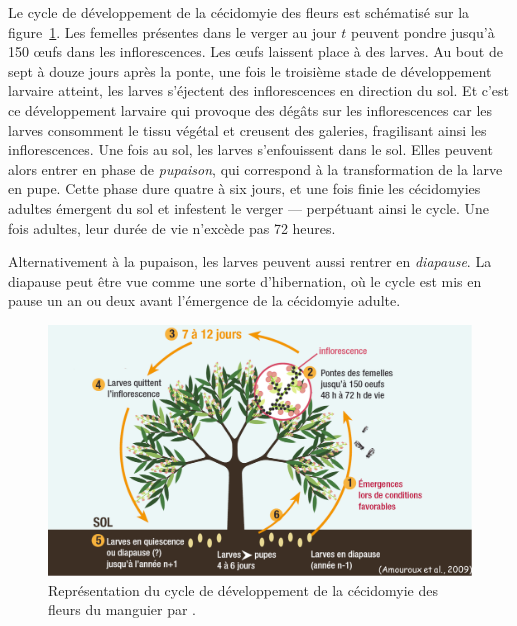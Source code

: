 
Le cycle de développement de la cécidomyie des fleurs est schématisé sur la figure~\ref{fig:cycle}.
Les femelles présentes dans le verger au jour $t$ peuvent pondre jusqu'à 150 œufs dans les inflorescences.
Les œufs laissent place à des larves.
Au bout de sept à douze jours après la ponte, une fois le troisième stade de développement larvaire atteint, les larves s'éjectent des inflorescences en direction du sol.
Et c'est ce développement larvaire qui provoque des dégâts sur les inflorescences car les larves consomment le tissu végétal et creusent des galeries, fragilisant ainsi les inflorescences.
Une fois au sol, les larves s'enfouissent dans le sol. 
Elles peuvent alors entrer en phase de \emph{pupaison}, qui correspond à la transformation de la larve en pupe.
Cette phase dure quatre à six jours, et une fois finie les cécidomyies adultes émergent du sol et infestent le verger --- perpétuant ainsi le cycle. 
Une fois adultes, leur durée de vie n'excède pas 72 heures.

Alternativement à la pupaison, les larves peuvent aussi rentrer en \emph{diapause}.
La diapause peut être vue comme une sorte d'hibernation, où le cycle est mis en pause un an ou deux avant l'émergence de la cécidomyie adulte.


%
\begin{figure}
 \centering
 \includegraphics[scale = 0.33]{photos/cycle.png}
 \caption{Représentation du cycle de développement de la cécidomyie des fleurs du manguier par \citet{paulguide}.}
 \label{fig:cycle}
\end{figure}
%

